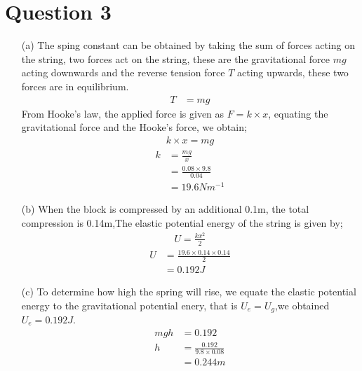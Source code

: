 \documentclass[12pt,a4paper]{article}
\begin{document}
\section*{Question 3}
\begin{itemize}
\item[(a)]
The sping constant can be obtained by taking the sum of forces acting on the string, two forces act on the string, these are the gravitational force $mg$ acting downwards and the reverse tension force $T$ acting upwards, these two forces are in equilibrium.
\begin{align}
T&=mg
\end{align}
From Hooke's law, the applied force is given as $F=k\times x$, equating the gravitational force and the Hooke's force, we obtain;  
\begin{align}
k\times x=mg
\end{align}
\begin{align*}
k&=\frac{mg}{x}\\
&=\frac{0.08\times9.8}{0.04}\\
&=19.6Nm^{-1}
\end{align*}
\item[(b)]
When the block is compressed by an additional 0.1m, the total compression is 0.14m,The elastic potential energy of the string is given by;\\
\begin{align}
U=\frac{kx^{2}}{2}
\end{align}
\begin{align*}
U&=\frac{19.6\times0.14\times0.14}{2}\\
&=0.192J
\end{align*}
\item[(c)]
To determine how high the spring will rise, we equate the elastic potential energy to the gravitational potential enery, that is $U_{e}=U_{g}$,we obtained $U_{e}=0.192J$.
\begin{align*}
mgh&=0.192\\
h&=\frac{0.192}{9.8\times0.08}\\
&=0.244m
\end{align*}
\end{itemize}
\end{document}
